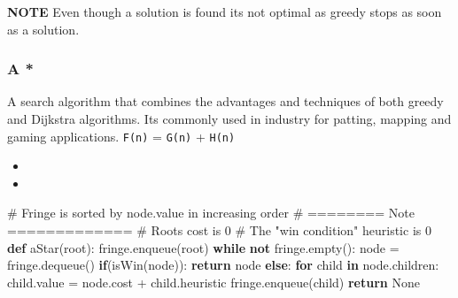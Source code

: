 \documentclass[
  letterpaper,
  DIV=11,
  numbers=noendperiod]{scrartcl}
\newenvironment{Shaded}{\begin{snugshade}}{\end{snugshade}}
\newcommand{\CommentTok}[1]{\textcolor[rgb]{0.37,0.37,0.37}{#1}}
\newcommand{\ControlFlowTok}[1]{\textcolor[rgb]{0.00,0.23,0.31}{\textbf{#1}}}
\newcommand{\KeywordTok}[1]{\textcolor[rgb]{0.00,0.23,0.31}{\textbf{#1}}}
\newcommand{\NormalTok}[1]{\textcolor[rgb]{0.00,0.23,0.31}{#1}}
\newcommand{\OperatorTok}[1]{\textcolor[rgb]{0.37,0.37,0.37}{#1}}
\newcommand{\VariableTok}[1]{\textcolor[rgb]{0.07,0.07,0.07}{#1}}
\providecommand{\tightlist}{%
  \setlength{\itemsep}{0pt}\setlength{\parskip}{0pt}}\usepackage{longtable,booktabs,array}
\begin{document}
\textbf{NOTE} Even though a solution is found its not optimal as greedy
stops as soon as a solution.

\subsubsection{A *}\label{a}

\begin{description}
\tightlist
\item[A Star (\texttt{*})]
A search algorithm that combines the advantages and techniques of both
greedy and Dijkstra algorithms. Its commonly used in industry for
patting, mapping and gaming applications. \texttt{F(n)} = \texttt{G(n)}
+ \texttt{H(n)}
\end{description}

\begin{tcolorbox}[enhanced jigsaw, toprule=.15mm, left=2mm, breakable, arc=.35mm, rightrule=.15mm, bottomrule=.15mm, leftrule=.75mm, colframe=quarto-callout-color-frame, opacityback=0, colback=white]

\begin{itemize}
\item
\item
\end{itemize}

\end{tcolorbox}

\begin{Shaded}
\begin{Highlighting}[]
\CommentTok{\# Fringe is sorted by node.value in increasing order}
\CommentTok{\# ======== Note =============}
\CommentTok{\# Root\textquotesingle{}s cost is 0}
\CommentTok{\# The "win condition" heuristic is 0  }
\KeywordTok{def}\NormalTok{ aStar(root):}
\NormalTok{  fringe.enqueue(root)}
  \ControlFlowTok{while} \KeywordTok{not}\NormalTok{ fringe.empty():}
\NormalTok{    node }\OperatorTok{=}\NormalTok{ fringe.dequeue()}
    \ControlFlowTok{if}\NormalTok{(isWin(node)):}
      \ControlFlowTok{return}\NormalTok{ node}
    \ControlFlowTok{else}\NormalTok{:}
      \ControlFlowTok{for}\NormalTok{ child }\KeywordTok{in}\NormalTok{ node.children:}
\NormalTok{        child.value }\OperatorTok{=}\NormalTok{ node.cost }\OperatorTok{+}\NormalTok{ child.heuristic }
\NormalTok{        fringe.enqueue(child)}
  \ControlFlowTok{return} \VariableTok{None}
\end{Highlighting}
\end{Shaded}
\end{document}
